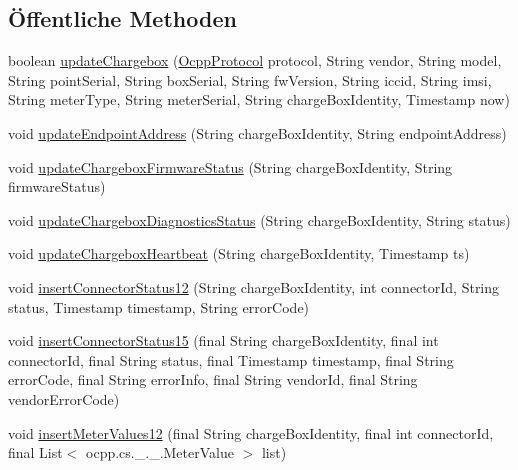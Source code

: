 \subsection*{Öffentliche Methoden}
\begin{DoxyCompactItemize}
\item 
boolean \hyperlink{classde_1_1rwth_1_1idsg_1_1steve_1_1repository_1_1_ocpp_server_repository_impl_af35a0384f08ea9f8983bbdbea9b8b51b}{update\-Chargebox} (\hyperlink{enumde_1_1rwth_1_1idsg_1_1steve_1_1ocpp_1_1_ocpp_protocol}{Ocpp\-Protocol} protocol, String vendor, String model, String point\-Serial, String box\-Serial, String fw\-Version, String iccid, String imsi, String meter\-Type, String meter\-Serial, String charge\-Box\-Identity, Timestamp now)
\item 
void \hyperlink{classde_1_1rwth_1_1idsg_1_1steve_1_1repository_1_1_ocpp_server_repository_impl_ac240ff5c55ebd61c202edb5c0f1ffe80}{update\-Endpoint\-Address} (String charge\-Box\-Identity, String endpoint\-Address)
\item 
void \hyperlink{classde_1_1rwth_1_1idsg_1_1steve_1_1repository_1_1_ocpp_server_repository_impl_aa1da9ce277523f4182448b8bd15a2a5b}{update\-Chargebox\-Firmware\-Status} (String charge\-Box\-Identity, String firmware\-Status)
\item 
void \hyperlink{classde_1_1rwth_1_1idsg_1_1steve_1_1repository_1_1_ocpp_server_repository_impl_aeec83e6dad09d54cb3b5cbf83f3f5fe0}{update\-Chargebox\-Diagnostics\-Status} (String charge\-Box\-Identity, String status)
\item 
void \hyperlink{classde_1_1rwth_1_1idsg_1_1steve_1_1repository_1_1_ocpp_server_repository_impl_af08981af3fd0d3a00f3c2a723924b59b}{update\-Chargebox\-Heartbeat} (String charge\-Box\-Identity, Timestamp ts)
\item 
void \hyperlink{classde_1_1rwth_1_1idsg_1_1steve_1_1repository_1_1_ocpp_server_repository_impl_a624f4eb1edbe55de29f7229070e6db8d}{insert\-Connector\-Status12} (String charge\-Box\-Identity, int connector\-Id, String status, Timestamp timestamp, String error\-Code)
\item 
void \hyperlink{classde_1_1rwth_1_1idsg_1_1steve_1_1repository_1_1_ocpp_server_repository_impl_aa2a351ab8577ee172d350b69dc7290d4}{insert\-Connector\-Status15} (final String charge\-Box\-Identity, final int connector\-Id, final String status, final Timestamp timestamp, final String error\-Code, final String error\-Info, final String vendor\-Id, final String vendor\-Error\-Code)
\item 
void \hyperlink{classde_1_1rwth_1_1idsg_1_1steve_1_1repository_1_1_ocpp_server_repository_impl_a4abeb5233b924efd91c19c0c76c4cae9}{insert\-Meter\-Values12} (final String charge\-Box\-Identity, final int connector\-Id, final List$<$ ocpp.\-cs.\-\_.\-\_.\-Meter\-Value $>$ list)

\end{DoxyCompactItemize}
